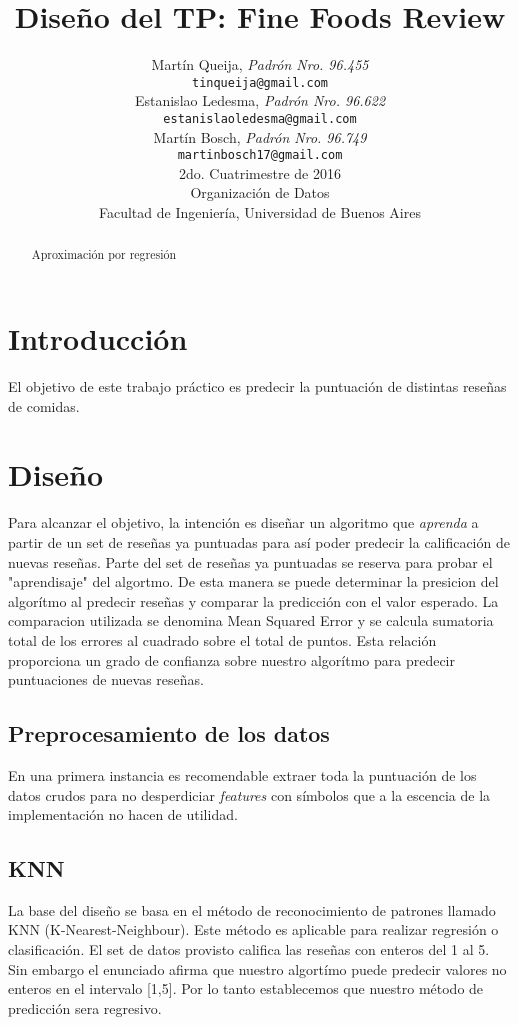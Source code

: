 \documentclass[a4paper,10pt]{article}
\title{	\textbf{Dise\~{n}o del TP: Fine Foods Review} }
\author{
    Mart\'{i}n Queija, \textit{Padr\'{o}n Nro. 96.455} \\
	\texttt{ tinqueija@gmail.com } \\[2.5ex]
	Estanislao Ledesma, \textit{Padr\'{o}n Nro. 96.622} \\
	\texttt{ estanislaoledesma@gmail.com } \\[2.5ex]
	Mart\'{i}n Bosch, \textit{Padr\'{o}n Nro. 96.749} \\
	\texttt{ martinbosch17@gmail.com } \\[2.5ex]
	\normalsize{2do. Cuatrimestre de 2016} \\
	\normalsize{ Organizaci\'{o}n de Datos } \\
	\normalsize{ Facultad de Ingenier\'{i}a, Universidad de Buenos Aires } \\
}
\date{}
\begin{document}
	\maketitle
	\thispagestyle{empty}   %


	\begin{abstract}
		\centerline{Aproximaci\'{o}n por regresi\'{o}n}
		
	\end{abstract}
	\newpage
	
	\tableofcontents
	
	
	\section{Introducci\'{o}n}
	
	El objetivo de este trabajo pr\'{a}ctico es predecir la puntuaci\'{o}n de distintas rese\~{n}as de comidas.
	
	\section{Dise\~{n}o}
	
	Para alcanzar el objetivo, la intenci\'{o}n es dise\~{n}ar un algoritmo que \textit{aprenda} a partir de un set de rese\~{n}as ya puntuadas para as\'{i} poder predecir la calificaci\'{o}n de nuevas rese\~{n}as. Parte del set de rese\~{n}as ya puntuadas se reserva para probar el "aprendisaje" del algortmo. De esta manera se puede determinar la presicion del algor\'{i}tmo al predecir rese\~{n}as y comparar la predicci\'{o}n con el valor esperado. La comparacion utilizada se denomina Mean Squared Error y se calcula sumatoria total de los errores al cuadrado sobre el total de puntos. Esta relaci\'{o}n proporciona un grado de confianza sobre nuestro algor\'{i}tmo para predecir puntuaciones de nuevas rese\~{n}as.
	
	
	\subsection{Preprocesamiento de los datos}	
	En una primera instancia es recomendable extraer toda la puntuaci\'{o}n de los datos crudos para no desperdiciar \textit{features} con s\'{i}mbolos que a la escencia de la implementaci\'{o}n no hacen de utilidad.
	
	\subsection{KNN}
	La base del dise\~{n}o se basa en el m\'{e}todo de reconocimiento de patrones llamado KNN (K-Nearest-Neighbour). Este m\'{e}todo es aplicable para realizar regresi\'{o}n o clasificaci\'{o}n. El set de datos provisto califica las rese\~{n}as con enteros del 1 al 5. Sin embargo el enunciado afirma que nuestro algort\'{i}mo puede predecir valores no enteros en el intervalo [1,5]. Por lo tanto establecemos que nuestro m\'{e}todo de predicci\'{o}n sera regresivo.
	
\end{document}
